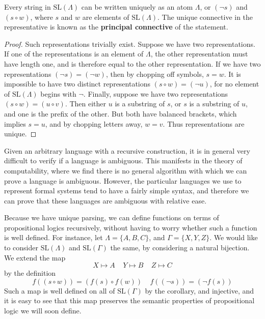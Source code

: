 \begin{corollary}
    Every string in $\text{SL}(\Lambda)$ can be written uniquely as an atom $\Lambda$, or $(\neg s)$ and $(s \circ w)$, where $s$ and $w$ are elements of $\text{SL}(\Lambda)$. The unique connective in the representative is known as the {\bf principal connective} of the statement.
\end{corollary}
\begin{proof}
    Such representations trivially exist. Suppose we have two representations. If one of the representations is an element of $\Lambda$, the other representation must have length one, and is therefore equal to the other representation. If we have two representations $(\neg s) = (\neg w)$, then by chopping off symbols, $s = w$. It is impossible to have two distinct representations $(s \circ w) = (\neg u)$, for no element of $\text{SL}(\Lambda)$ begins with $\neg$. Finally, suppose we have two representations $(s \circ w) = (u \circ v)$. Then either $u$ is a substring of $s$, or $s$ is a substring of $u$, and one is the prefix of the other. But both have balanced brackets, which implies $s = u$, and by chopping letters away, $w = v$. Thus representations are unique.
\end{proof}

Given an arbitrary language with a recursive construction, it is in general very difficult to verify if a language is ambiguous. This manifests in the theory of computability, where we find there is no general algorithm with which we can prove a language is ambiguous. However, the particular languages we use to represent formal systems tend to have a fairly simple syntax, and therefore we can prove that these languages are ambiguous with relative ease.

Because we have unique parsing, we can define functions on terms of propositional logics recursively, without having to worry whether such a function is well defined. For instance, let $\Lambda = \{ A, B, C \}$, and $\Gamma = \{ X, Y, Z \}$. We would like to consider $\text{SL}(\Lambda)$ and $\text{SL}(\Gamma)$ the same, by considering a natural bijection. We extend the map
%
\[ X \mapsto A\ \ \ \ \ Y \mapsto B\ \ \ \ \ Z \mapsto C \]
%
by the definition
%
\[ f((s \circ w)) = (f(s) \circ f(w))\ \ \ \ \ f((\neg s)) = (\neg f(s)) \]
%
Such a map is well defined on all of $\text{SL}(\Gamma)$ by the corollary, and injective, and it is easy to see that this map preserves the semantic properties of propositional logic we will soon define.

